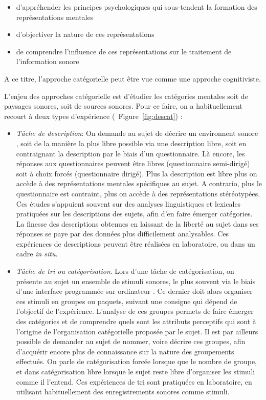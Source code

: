 \begin{itemize}
\item d'appréhender les principes psychologiques qui sous-tendent la formation des représentations mentales
\item d'objectiver la nature de ces représentations
\item de comprendre l'influence de ces représentations sur le traitement de l'information sonore
\end{itemize}
 
A ce titre, l'approche catégorielle peut être vue comme une approche cognitiviste. 

L'enjeu des approches catégorielle est d'étudier les catégories mentales soit de paysages sonores, soit de sources sonores. Pour ce faire, on a habituellement recourt à deux types d'expérience (\Cf~Figure~\ref{fig:descat}) :

\begin{itemize}
\item \emph{Tâche de description}: On demande au sujet de décrire un environnent sonore \citep{axelsson2005soundscape,raimbault2005urban,guastavino2006ideal,raimbault2006qualitative}, soit de la manière la plus libre possible via une description libre, soit en contraignant la description par le biais d'un questionnaire. Là encore, les réponses aux questionnaires peuvent être libres (questionnaire semi-dirigé) soit à choix forcés (questionnaire dirigé). Plus la description est libre plus on accède à des représentations mentales spécifiques au sujet. A contrario, plus le questionnaire est contraint, plus on accède à des représentations stéréotypées. Ces études s'appuient souvent sur des analyses linguistiques et lexicales pratiquées sur les descriptions des sujets, afin d'en faire émerger catégories. La finesse des descriptions obtenues en laissant de la liberté au sujet dans ses réponses se paye par des données plus difficilement analysables. Ces expériences de descriptions peuvent être réalisées en laboratoire, ou dans un cadre \emph{in situ}.
\item \emph{Tâche de tri ou catégorisation}. Lors d'une tâche de catégorisation, on présente au sujet un ensemble de stimuli sonores, le plus souvent via le biais d'une interface programmée sur ordinateur \citep{maffiolo_caracterisation_1999,guastavino2007categorization}. Ce dernier doit alors organiser ces stimuli en groupes ou paquets, suivant une consigne qui dépend de l'objectif de l’expérience. L'analyse de ces groupes permets de faire émerger des catégories et de comprendre quels sont les attributs perceptifs qui sont à l'origine de l'organisation catégorielle proposée par le sujet. Il est par ailleurs possible de demander au sujet de nommer, voire décrire ces groupes, afin d'acquérir encore plus de connaissance sur la nature des groupements effectués. On parle de catégorisation forcée lorsque que le nombre de groupe, et dans catégorisation libre lorsque le sujet reste libre d'organiser les stimuli comme il l'entend. Ces expériences de tri sont pratiquées en laboratoire, en utilisant habituellement des enregistrements sonores comme stimuli.
\end{itemize}



